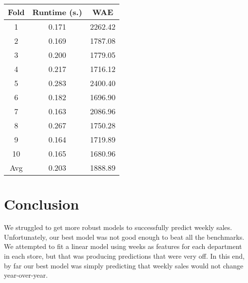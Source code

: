 \documentclass{article}
\begin{document}
\begin{center}
    \begin{tabular}{|c|c|c|}
        \hline
        Fold & Runtime (s.) & WAE \\ 
        \hline \hline 
        1 & 0.171 & 2262.42 \\ 
        \hline
        2 & 0.169 & 1787.08 \\ 
        \hline
        3 & 0.200 & 1779.05 \\ 
        \hline
        4 & 0.217 & 1716.12 \\ 
        \hline
        5 & 0.283 & 2400.40 \\ 
        \hline
        6 & 0.182 & 1696.90 \\ 
        \hline
        7 & 0.163 & 2086.96 \\ 
        \hline
        8 & 0.267 & 1750.28 \\ 
        \hline
        9 & 0.164 & 1719.89 \\ 
        \hline
        10 & 0.165 & 1680.96 \\ 
        \hline
        Avg & 0.203 & 1888.89 \\ 
        \hline 
    \end{tabular}
\end{center}


\section{Conclusion}

We struggled to get more robust models to successfully predict weekly sales.
Unfortunately, our best model was not good enough to beat all the benchmarks.
We attempted to fit a linear model using weeks as features for each
department in each store, but that was producing predictions that were very
off. In this end, by far our best model was simply predicting that weekly
sales would not change year-over-year. 
\end{document}
